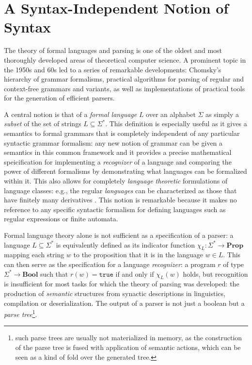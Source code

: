\documentclass[sigconf,anonymous,review,screen]{acmart}
\newcommand{\Prop}{\mathbf{Prop}}
\newcommand{\Bool}{\mathbf{Bool}}
\begin{document}
\maketitle

\section{A Syntax-Independent Notion of Syntax}

The theory of formal languages and parsing is one of the oldest and
most thoroughly developed areas of theoretical computer science. A
prominent topic in the 1950s and 60s led to a series of remarkable
developments: Chomsky's hierarchy of grammar formalisms, practical
algorithms for parsing of regular and context-free grammars and
variants, as well as implementations of practical tools for the
generation of efficient parsers.

A central notion is that of a \emph{formal language} $L$ over an
alphabet $\Sigma$ as simply a \emph{subset} of the set of strings $L
\subseteq \Sigma^*$. This definition is especially useful as it gives
a semantics to formal grammars that is completely independent of any
particular syntactic grammar formalism: any new notion of grammar can
be given a semantics in this common framework and it provides a
precise mathematical speicification for implementing a
\emph{recognizer} of a language and comparing the power of different
formalisms by demonstrating what languages can be formalized within
it. This also allows for completely \emph{language theoretic}
formulations of language classes: e.g., the regular \emph{languages}
can be characterized as those that have finitely many derivatives
\cite{brzozowski-or-myhill-nerode-idk}. This notion is remarkable
because it makes no reference to any specific syntactic formalism for
defining languages such as regular expressions or finite automata.

Formal language theory alone is not sufficient as a specification of a
parser: a language $L \subseteq \Sigma^*$ is equivalently defined as
its indicator function $\chi_L : \Sigma^* \to \Prop$ mapping each
string $w$ to the proposition that it is in the language $w \in
L$. This can then serve as the specification for a language
\emph{recognizer}: a program $r$ of type $\Sigma^* \to \Bool$ such
that $r(w) = \texttt{true}$ if and only if $\chi_L(w)$ holds, but
recognition is insufficient for most tasks for which the theory of
parsing was developed: the production of \emph{semantic} structures
from synactic descriptions in linguistics, compilation or
deserialization. The output of a parser is not just a boolean but a
\emph{parse tree}\footnote{such parse trees are usually not
materialized in memory, as the construction of the parse tree is fused
with application of semantic actions, which can be seen as a kind of
fold over the generated tree.}.
\end{document}
